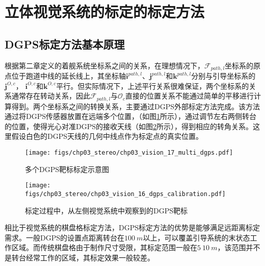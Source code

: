 \section{立体视觉系统的标定的标定方法}
\subsection{DGPS标定方法基本原理}
根据第二章定义的着舰系统坐标系之间的关系，在理想情况下，$\mathcal{F}_{path,l}$坐标系的原点位于跑道中线的延长线上，其坐标轴$\mathbf{i}^{path,l}$、$\mathbf{j}^{path,l}$和$\mathbf{k}^{path,l}$分别与引导坐标系的$\mathbf{j}^{O,c}$， $\mathbf{i}^{O,c}$和$\mathbf{k}^{O,c}$平行。但实际情况下，上述平行关系很难保证，两个坐标系的关系通常存在转动关系，因此$\mathcal{F}_{path,l}$与$\mathcal{O}_c$直接的位置关系不能通过简单的平移进行计算得到。两个坐标系之间的转换关系，主要通过DGPS外部标定方法完成\cite{liao2009automatic}。该方法通过将DGPS传感器放置在远端多个位置，（如图\ref{fig:chp03_vision_17_multi_dgps}所示），通过调节左右两侧转台的位置，使得光心对准DGPS的接收天线（如图\ref{fig:chp03_vision_16_dgps_calibration}所示），得到相应的转角关系。这里假设白色的DGPS天线的几何中线点作为标定点的真实位置。

\begin{figure}[!th]
	\centering
	\texttt{[image: figs/chp03\_stereo/chp03\_vision\_17\_multi\_dgps.pdf]}	
	\caption{多个DGPS靶标标定示意图}
	\label{fig:chp03_vision_17_multi_dgps}
\end{figure}


\begin{figure}[htb]
	\centering
	\texttt{[image: figs/chp03\_stereo/chp03\_vision\_16\_dgps\_calibration.pdf]}	
	\caption{标定过程中，从左侧视觉系统中观察到的DGPS靶标}
	\label{fig:chp03_vision_16_dgps_calibration}
\end{figure}


相比于视觉系统的棋盘格标定方法，DGPS标定方法的优势是能够满足远距离标定需求。一般DGPS的设置点距离转台在$100\ m$以上，可以覆盖引导系统的末状态工作区域。而传统棋盘格由于制作尺寸受限，其标定范围一般在$5~10\ m$，该范围并不是转台经常工作的区域，其标定效果一般较差。

